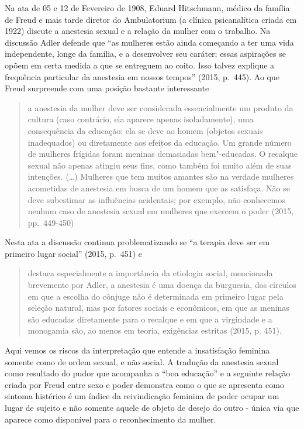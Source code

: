 Na ata de 05 e 12 de Fevereiro de 1908, Eduard Hitschmann, médico da
família de Freud e mais tarde diretor do Ambulatorium (a clínica
psicanalítica criada em 1922) discute a anestesia sexual e a relação da
mulher com o trabalho. Na discussão Adler defende que ``as mulheres
estão ainda começando a ter uma vida independente, longe da família, e a
desenvolver seu caráter; essas aspirações se opõem em certa medida a que
se entreguem ao coito. Isso talvez explique a frequência particular da
anestesia em nossos tempos'' (2015, p.~445). Ao que Freud surpreende com
uma posição bastante interessante

\begin{quote}
a anestesia da mulher deve ser considerada essencialmente um produto da
cultura (caso contrário, ela aparece apenas isoladamente), uma
consequência da educação: ela se deve ao homem (objetos sexuais
inadequados) ou diretamente aos efeitos da educação. Um grande número de
mulheres frígidas foram meninas demasiadas bem"-educadas. O recalque
sexual não apenas atingiu seus fins, como também foi muito além de suas
intenções. (\ldots{}) Mulheres que tem muitos amantes são na verdade mulheres
acometidas de anestesia em busca de um homem que as satisfaça. Não se
deve subestimar as influências acidentais; por exemplo, não conhecemos
nenhum caso de anestesia sexual em mulheres que exercem o poder (2015,
pp.~449-450)
\end{quote}

Nesta ata a discussão continua problematizando se ``a terapia deve ser em
primeiro lugar social'' (2015, p.~451) e

\begin{quote}
destaca especialmente a importância da etiologia social, mencionada
brevemente por Adler, a anestesia é uma doença da burguesia, dos
círculos em que a escolha do cônjuge não é determinada em primeiro lugar
pela seleção natural, mas por fatores sociais e econômicos, em que as
meninas são educadas diretamente para o recalque e em que a virgindade e
a monogamia são, ao menos em teoria, exigências estritas (2015, p. 451).
\end{quote}

Aqui vemos os riscos da interpretação que entende a insatisfação
feminina somente como de ordem sexual, e não social. A tradução da
anestesia sexual como resultado do pudor que acompanha a ``boa
educação'' e a seguinte relação criada por Freud entre sexo e poder
demonstra como o que se apresenta como sintoma histérico é um índice da
reivindicação feminina de poder ocupar um lugar de sujeito e não somente
aquele de objeto de desejo do outro - única via que aparece como
disponível para o reconhecimento da mulher.

